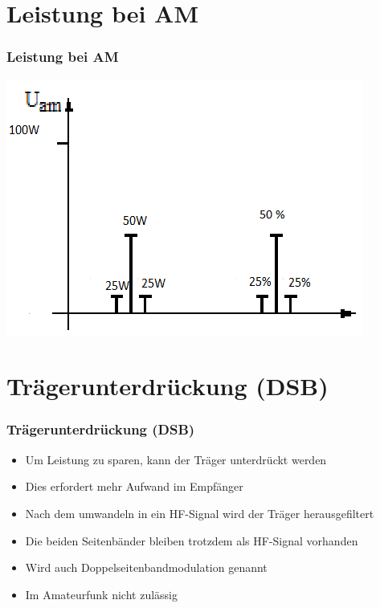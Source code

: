 \section*{Leistung bei AM}
\begin{frame}
\frametitle{Leistung bei AM}
\includegraphics[scale=0.8]{e14/AMP.png}
\end{frame}

\section{Trägerunterdrückung (DSB)}
\begin{frame}
\frametitle{Trägerunterdrückung (DSB)}
\begin{itemize}
	\item Um Leistung zu sparen, kann der Träger unterdrückt werden
	\item Dies erfordert mehr Aufwand im Empfänger
	\item Nach dem umwandeln in ein HF-Signal wird der Träger herausgefiltert
	\item Die beiden Seitenbänder bleiben trotzdem als HF-Signal vorhanden
	\item Wird auch Doppelseitenbandmodulation genannt
	\item Im Amateurfunk nicht zulässig
\end{itemize}
\end{frame}

